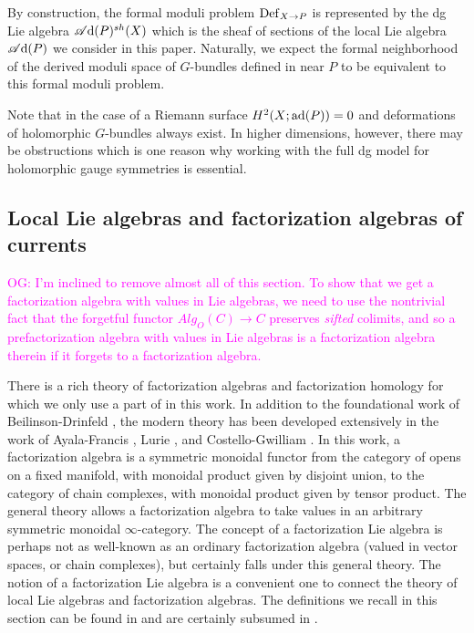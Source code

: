 \documentclass[10pt]{amsart}
\def\sAd{\sA{\rm d}}
\def\owen{\textcolor{magenta}{OG: }\textcolor{magenta}}
\begin{document}
By construction, the formal moduli problem ${\rm Def}_{X \to P}$ is represented by the dg Lie algebra $\sAd(P)^{sh}(X)$ which is the sheaf of sections of the local Lie algebra $\sAd(P)$ we consider in this paper. 
Naturally, we expect the formal neighborhood of the derived moduli space of $G$-bundles defined in \cite{FHK} near $P$ to be equivalent to this formal moduli problem.

Note that in the case of a Riemann surface $H^2 (X ; {\rm ad}(P)) = 0$ and deformations of holomorphic $G$-bundles always exist. 
In higher dimensions, however, there may be obstructions which is one reason why working with the full dg model for holomorphic gauge symmetries is essential. 

\subsection{Local Lie algebras and factorization algebras of currents}

\def\Ch{{\rm Ch}}
\def\dgLie{{\rm dgLie}}
\def\Lcat{L_\infty{\rm Alg}}

\owen{I'm inclined to remove almost all of this section. To show that we get a factorization algebra with values in Lie algebras, we need to use the nontrivial fact that the forgetful functor $Alg_O(C) \to C$ preserves {\em sifted} colimits, and so a prefactorization algebra with values in Lie algebras is a factorization algebra therein if it forgets to a factorization algebra.}
 
There is a rich theory of factorization algebras and factorization homology for which we only use a part of in this work. 
In addition to the foundational work of Beilinson-Drinfeld \cite{BD}, the modern theory has been developed extensively in the work of Ayala-Francis \cite{AFTopMan}, Lurie \cite{LurieHA}, and Costello-Gwilliam \cite{CG1,CG2}.
In this work, a factorization algebra is a symmetric monoidal functor from the category of opens on a fixed manifold, with monoidal product given by disjoint union, to the category of chain complexes, with monoidal product given by tensor product.
The general theory allows a factorization algebra to take values in an arbitrary symmetric monoidal $\infty$-category.
The concept of a factorization Lie algebra is perhaps not as well-known as an ordinary factorization algebra (valued in vector spaces, or chain complexes), but certainly falls under this general theory.
The notion of a factorization Lie algebra is a convenient one to connect the theory of local Lie algebras and factorization algebras.
The definitions we recall in this section can be found in \cite{CG1} and are certainly subsumed in \cite{LurieHA}. 
\end{document}
